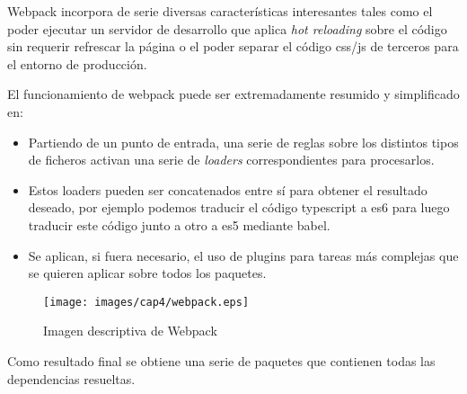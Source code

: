 \bigskip
Webpack incorpora de serie diversas características interesantes tales como el 
poder ejecutar un servidor de desarrollo que aplica \textit{hot reloading} sobre el código 
sin requerir refrescar la página o el poder separar el código css/js de terceros para el 
entorno de producción. 

\bigskip 
El funcionamiento de webpack puede ser extremadamente resumido y simplificado en:

\begin{itemize}

\item Partiendo de un punto de entrada, una serie de reglas sobre los distintos tipos de ficheros
activan una serie de \textit{loaders} correspondientes para procesarlos. 

\item Estos loaders pueden ser concatenados entre sí para obtener el resultado deseado, por ejemplo
podemos traducir el código typescript a es6 para luego traducir este código junto a otro a es5 mediante
babel.

\item Se aplican, si fuera necesario, el uso de plugins para tareas más complejas que se quieren aplicar sobre
todos los paquetes.

\end{itemize}

\begin{figure}[!th]
\begin{center}
\texttt{[image: images/cap4/webpack.eps]}
\caption{Imagen descriptiva de Webpack}
\label{fig:Imagen descriptiva de Webpack}
\end{center}
\end{figure}


Como resultado final se obtiene una serie de paquetes que contienen todas las dependencias resueltas.